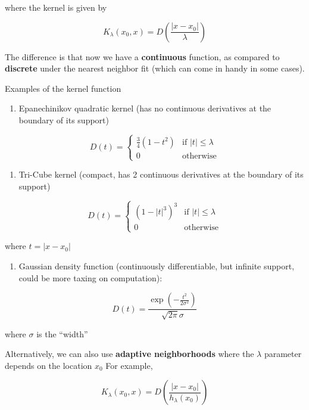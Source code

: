 \documentclass[
]{book}
\providecommand{\tightlist}{%
  \setlength{\itemsep}{0pt}\setlength{\parskip}{0pt}}
\begin{document}
where the kernel is given by

\[
K_\lambda(x_0,x) = D(\frac{|x-x_0|}{\lambda})
\]

The difference is that now we have a \textbf{continuous} function, as compared to \textbf{discrete} under the nearest neighbor fit (which can come in handy in some cases).

Examples of the kernel function

\begin{enumerate}
\def\labelenumi{\arabic{enumi}.}
\tightlist
\item
  Epanechinikov quadratic kernel (has no continuous derivatives at the boundary of its support)
\end{enumerate}

\[
D(t) = 
\begin{cases}
\frac{3}{4}(1-t^2) & \text{if } |t| \le \lambda \\
0 & \text{otherwise}
\end{cases}
\]

\begin{enumerate}
\def\labelenumi{\arabic{enumi}.}
\setcounter{enumi}{1}
\tightlist
\item
  Tri-Cube kernel (compact, has 2 continuous derivatives at the boundary of its support)
\end{enumerate}

\[
D(t) = 
\begin{cases}
(1- |t|^3)^3 & \text{if } |t| \le \lambda \\
0 & \text{otherwise}
\end{cases}
\]

where \(t = |x- x_0|\)

\begin{enumerate}
\def\labelenumi{\arabic{enumi}.}
\setcounter{enumi}{2}
\tightlist
\item
  Gaussian density function (continuously differentiable, but infinite support, could be more taxing on computation):
\end{enumerate}

\[
D(t) = \frac{\exp(-\frac{t^2}{2\sigma^2})}{\sqrt{2 \pi}\sigma}
\]

where \(\sigma\) is the ``width''

Alternatively, we can also use \textbf{adaptive neighborhoods} where the \(\lambda\) parameter depends on the location \(x_0\) For example,

\[
K_\lambda (x_0, x) = D(\frac{|x-x_0|}{h_\lambda(x_0)})
\]
\end{document}
